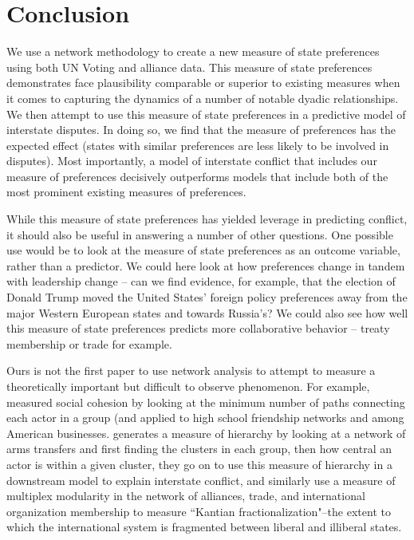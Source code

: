 \section*{Conclusion}

We use a network methodology to create a new measure of state preferences using both UN Voting and alliance data. This measure of state preferences demonstrates face plausibility comparable or superior to existing measures when it comes to capturing the dynamics of a number of notable dyadic relationships. We then attempt to use this measure of state preferences in a predictive model of interstate disputes. In doing so, we find that the measure of preferences has the expected effect (states with similar preferences are less likely to be involved in disputes). Most importantly, a model of interstate conflict that includes our measure of preferences decisively outperforms models that include both of the most prominent existing measures of preferences.

While this measure of state preferences has yielded leverage in predicting conflict, it should also be useful in answering a number of other questions. One possible use would be to look at the measure of state preferences as an outcome variable, rather than a predictor. We could here look at how preferences change in tandem with leadership change -- can we find evidence, for example, that the election of Donald Trump moved the United States' foreign policy preferences away from the major Western European states and towards Russia's? We could also see how well this measure of state preferences predicts more collaborative behavior -- treaty membership or trade for example.

Ours is not the first paper to use network analysis to attempt to measure a theoretically important but difficult to observe phenomenon. For example, \citet{moody:white:2003} measured social cohesion by looking at the minimum number of paths connecting each actor in a group (and applied to high school friendship networks and among American businesses. \citet{beardsley:etal:2018} generates a measure of hierarchy by looking at a network of arms transfers and first finding the clusters in each group,  then how central an actor is within a given cluster, they go on to use this measure of hierarchy in a downstream model to explain interstate conflict, and similarly \citet{cranmer:etal:2015} use a measure of multiplex modularity in the network of alliances, trade, and international organization membership to measure ``Kantian fractionalization"--the extent to which the international system is fragmented between liberal and illiberal states. 


